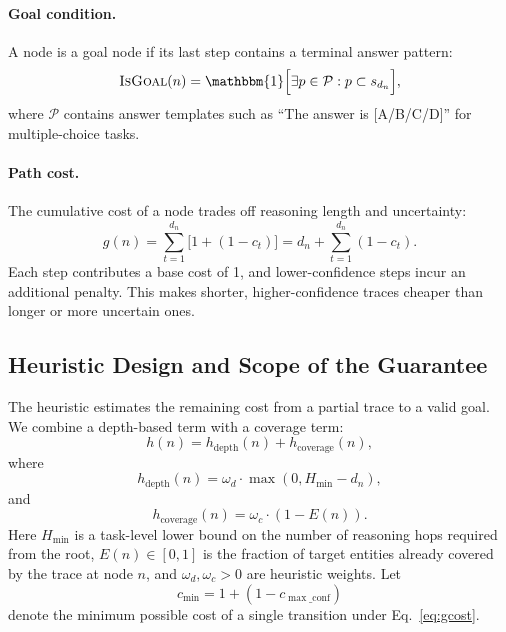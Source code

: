 \documentclass[11pt]{article}
\begin{document}
\paragraph{Goal condition.}
A node is a goal node if its last step contains a terminal answer pattern:
\begin{equation}
\textsc{IsGoal}(n) = \mathbbm{1}\Big[\exists p \in \mathcal{P}: p \subset s_{d_n}\Big],
\label{eq:isgoal}
\end{equation}
where $\mathcal{P}$ contains answer templates such as ``The answer is [A/B/C/D]'' for multiple-choice tasks.

\paragraph{Path cost.}
The cumulative cost of a node trades off reasoning length and uncertainty:
\begin{equation}
g(n) = \sum_{t=1}^{d_n} \big[1 + (1-c_t)\big]
    = d_n + \sum_{t=1}^{d_n}(1-c_t).
\label{eq:gcost}
\end{equation}
Each step contributes a base cost of 1, and lower-confidence steps incur an additional penalty. This makes shorter, higher-confidence traces cheaper than longer or more uncertain ones.

\subsection{Heuristic Design and Scope of the Guarantee}
\label{sec:heuristic}

The heuristic estimates the remaining cost from a partial trace to a valid goal. We combine a depth-based term with a coverage term:
\begin{equation}
h(n) = h_{\text{depth}}(n) + h_{\text{coverage}}(n),
\label{eq:heuristic}
\end{equation}
where
\begin{equation}
h_{\text{depth}}(n) = \omega_d \cdot \max(0, H_{\min} - d_n),
\label{eq:hdepth}
\end{equation}
and
\begin{equation}
h_{\text{coverage}}(n) = \omega_c \cdot (1 - E(n)).
\label{eq:hcoverage}
\end{equation}
Here $H_{\min}$ is a task-level lower bound on the number of reasoning hops required from the root, $E(n) \in [0,1]$ is the fraction of target entities already covered by the trace at node $n$, and $\omega_d, \omega_c > 0$ are heuristic weights. Let
\begin{equation}
c_{\min} = 1 + (1 - c_{\max\_\text{conf}})
\label{eq:cmin}
\end{equation}
denote the minimum possible cost of a single transition under Eq.~\eqref{eq:gcost}.
\end{document}
